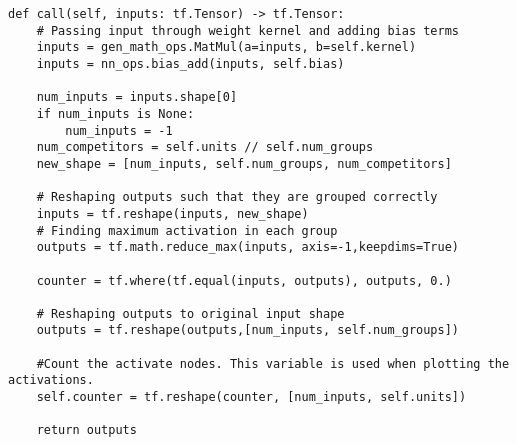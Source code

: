 \begin{lstlisting}[caption={Python implementation for the custom activation function used to define the maxout layer.},captionpos=b, label={lst:max_out}]
def call(self, inputs: tf.Tensor) -> tf.Tensor:
    # Passing input through weight kernel and adding bias terms
    inputs = gen_math_ops.MatMul(a=inputs, b=self.kernel)
    inputs = nn_ops.bias_add(inputs, self.bias)

    num_inputs = inputs.shape[0]
    if num_inputs is None:
        num_inputs = -1
    num_competitors = self.units // self.num_groups
    new_shape = [num_inputs, self.num_groups, num_competitors]

    # Reshaping outputs such that they are grouped correctly
    inputs = tf.reshape(inputs, new_shape)
    # Finding maximum activation in each group
    outputs = tf.math.reduce_max(inputs, axis=-1,keepdims=True)

    counter = tf.where(tf.equal(inputs, outputs), outputs, 0.)
    
    # Reshaping outputs to original input shape
    outputs = tf.reshape(outputs,[num_inputs, self.num_groups])   

    #Count the activate nodes. This variable is used when plotting the activations.
    self.counter = tf.reshape(counter, [num_inputs, self.units])

    return outputs
\end{lstlisting}
